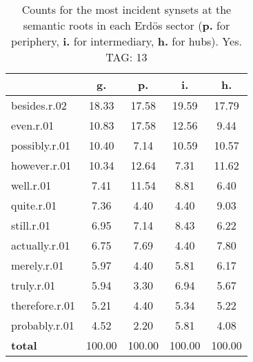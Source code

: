 \begin{table}[h!]
\begin{center}
\begin{tabular}{| l || c | c | c | c |}\hline
 & {\bf g.} & {\bf p.} & {\bf i.} & {\bf h.} \\\hline\hline
besides.r.02 & 18.33  & 17.58  & 19.59  & 17.79 \\\hline
even.r.01 & 10.83  & 17.58  & 12.56  & 9.44 \\\hline
possibly.r.01 & 10.40  & 7.14  & 10.59  & 10.57 \\\hline
however.r.01 & 10.34  & 12.64  & 7.31  & 11.62 \\\hline
well.r.01 & 7.41  & 11.54  & 8.81  & 6.40 \\\hline
quite.r.01 & 7.36  & 4.40  & 4.40  & 9.03 \\\hline
still.r.01 & 6.95  & 7.14  & 8.43  & 6.22 \\\hline
actually.r.01 & 6.75  & 7.69  & 4.40  & 7.80 \\\hline
merely.r.01 & 5.97  & 4.40  & 5.81  & 6.17 \\\hline
truly.r.01 & 5.94  & 3.30  & 6.94  & 5.67 \\\hline
therefore.r.01 & 5.21  & 4.40  & 5.34  & 5.22 \\\hline
probably.r.01 & 4.52  & 2.20  & 5.81  & 4.08 \\\hline\hline
{{\bf total}} & 100.00  & 100.00  & 100.00  & 100.00 \\\hline
\end{tabular}
\caption{Counts for the most incident synsets at the semantic roots in each Erd\"os sector ({\bf p.} for periphery, {\bf i.} for intermediary, {\bf h.} for hubs). Yes. TAG: 13}
\end{center}
\end{table}